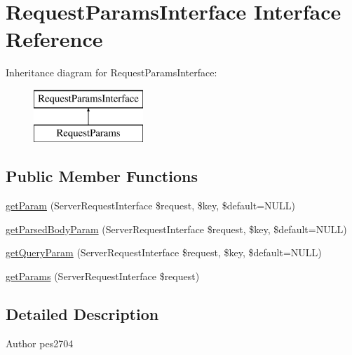 \hypertarget{interface_pes_1_1_http_1_1_request_1_1_request_params_interface}{}\section{Request\+Params\+Interface Interface Reference}
\label{interface_pes_1_1_http_1_1_request_1_1_request_params_interface}
Inheritance diagram for Request\+Params\+Interface\+:\begin{figure}[H]
\begin{center}
\leavevmode
\includegraphics[height=2.000000cm]{interface_pes_1_1_http_1_1_request_1_1_request_params_interface}
\end{center}
\end{figure}
\subsection*{Public Member Functions}
\begin{DoxyCompactItemize}
\item 
\mbox{\hyperlink{interface_pes_1_1_http_1_1_request_1_1_request_params_interface_a3293ae069cee967716d29c8d5ab14755}{get\+Param}} (Server\+Request\+Interface \$request, \$key, \$default=N\+U\+LL)
\item 
\mbox{\hyperlink{interface_pes_1_1_http_1_1_request_1_1_request_params_interface_a29e01720b8186851ed442d4631b84801}{get\+Parsed\+Body\+Param}} (Server\+Request\+Interface \$request, \$key, \$default=N\+U\+LL)
\item 
\mbox{\hyperlink{interface_pes_1_1_http_1_1_request_1_1_request_params_interface_a2e5741fedbbdec989996e8e31d1f4b45}{get\+Query\+Param}} (Server\+Request\+Interface \$request, \$key, \$default=N\+U\+LL)
\item 
\mbox{\hyperlink{interface_pes_1_1_http_1_1_request_1_1_request_params_interface_ab8608dd4c8a0447d65e8f48dcec561b7}{get\+Params}} (Server\+Request\+Interface \$request)
\end{DoxyCompactItemize}


\subsection{Detailed Description}
\begin{DoxyAuthor}{Author}
pes2704 
\end{DoxyAuthor}


